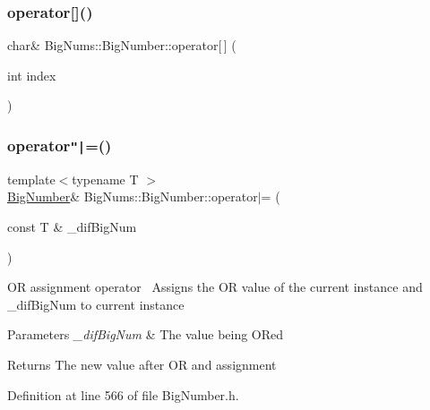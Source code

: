 \subsubsection{\texorpdfstring{operator[]()}{operator[]()}\hspace{0.1cm}{\footnotesize\ttfamily [2/2]}}
{\footnotesize\ttfamily char\& Big\+Nums\+::\+Big\+Number\+::operator\mbox{[}$\,$\mbox{]} (\begin{DoxyParamCaption}\item[{int}]{index }\end{DoxyParamCaption})}

\mbox{\label{class_big_nums_1_1_big_number_acae6ae7757f89b2971c22d5d3c0cca29}} 
\subsubsection{\texorpdfstring{operator\texttt{"|}=()}{operator|=()}}
{\footnotesize\ttfamily template$<$typename T $>$ \\
\mbox{\hyperlink{class_big_nums_1_1_big_number}{Big\+Number}}\& Big\+Nums\+::\+Big\+Number\+::operator$\vert$= (\begin{DoxyParamCaption}\item[{const T \&}]{\+\_\+dif\+Big\+Num }\end{DoxyParamCaption})\hspace{0.3cm}{\ttfamily [inline]}}

OR assignment operator~\newline
 Assigns the OR value of the current instance and \+\_\+dif\+Big\+Num to current instance 
\begin{DoxyParams}{Parameters}
{\em \+\_\+dif\+Big\+Num} & The value being O\+Red \\
\hline
\end{DoxyParams}
\begin{DoxyReturn}{Returns}
The new value after OR and assignment 
\end{DoxyReturn}


Definition at line 566 of file Big\+Number.\+h.

\mbox{\label{class_big_nums_1_1_big_number_a3b66caf45f60c11461d9f747c2245aa2}} 

